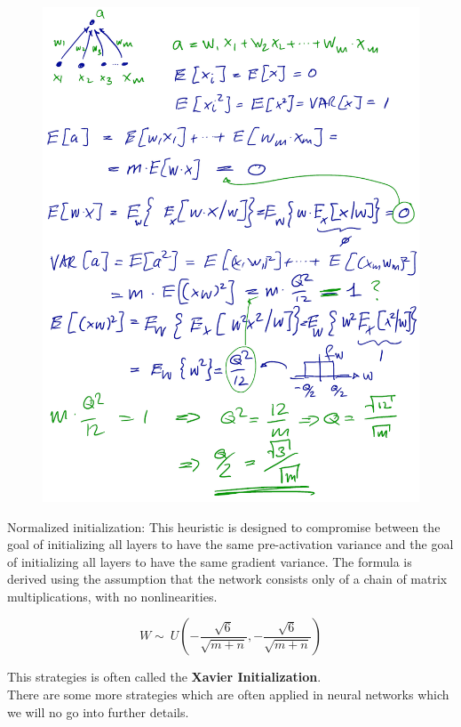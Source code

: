 \begin{multicols}{2}
	\begin{figure}[H]
		\centering
		\includegraphics[width=0.9\linewidth]{images/InitStrat.png}
	\end{figure}

	Normalized initialization: This heuristic is designed to compromise between the goal of initializing all layers to have the same pre-activation variance and the goal of initializing all layers to have the same gradient variance. The formula is derived using the assumption that the network consists only of a chain of matrix multiplications, with no nonlinearities.
	
	\[ W \sim\ U ( -\frac{\sqrt{6}}{\sqrt{m + n}}, -\frac{\sqrt{6}}{\sqrt{m + n}} )  \]
	
	This strategies is often called the \textbf{Xavier Initialization}.\\
	There are some more strategies which are often applied in neural networks which we will no go into further details.
	
	

	\newpage
\end{multicols}





































